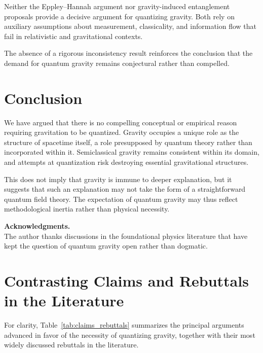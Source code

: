 \documentclass[12pt]{article}
\begin{document}
Neither the Eppley--Hannah argument nor gravity-induced entanglement proposals
provide a decisive argument for quantizing gravity. Both rely on auxiliary
assumptions about measurement, classicality, and information flow that fail in
relativistic and gravitational contexts.

The absence of a rigorous inconsistency result reinforces the conclusion that
the demand for quantum gravity remains conjectural rather than compelled.


\section{Conclusion}

We have argued that there is no compelling conceptual or empirical reason
requiring gravitation to be quantized. Gravity occupies a unique role as the
structure of spacetime itself, a role presupposed by quantum theory rather than
incorporated within it. Semiclassical gravity remains consistent within its
domain, and attempts at quantization risk destroying essential gravitational
structures.

This does not imply that gravity is immune to deeper explanation, but it
suggests that such an explanation may not take the form of a straightforward
quantum field theory. The expectation of quantum gravity may thus reflect
methodological inertia rather than physical necessity.

\bigskip
\noindent\textbf{Acknowledgments.} \\
The author thanks discussions in the foundational physics literature that have
kept the question of quantum gravity open rather than dogmatic.

\section{Contrasting Claims and Rebuttals in the Literature}

For clarity, Table~\ref{tab:claims_rebuttals} summarizes the principal
arguments advanced in favor of the necessity of quantizing gravity, together
with their most widely discussed rebuttals in the literature.
\end{document}
